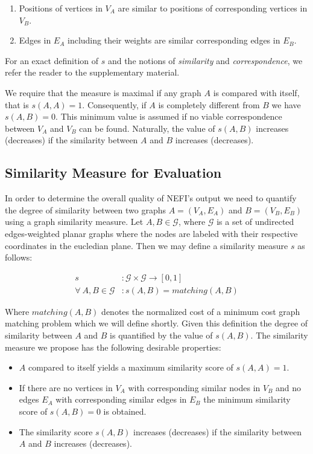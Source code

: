 		\begin{enumerate}
		\item Positions of vertices in $V_A$ are similar to positions of corresponding vertices in $V_B$.  
		\item Edges in $E_A$ including their weights are similar corresponding edges in $E_B$. 
		\end{enumerate}

		For an exact definition of $s$ and the notions of \emph{similarity} and \emph{correspondence}, we refer the reader to the supplementary material. 

		We require that the measure is maximal if any graph $A$ is compared with itself, that is $s(A,A) = 1$. Consequently, if $A$ is completely different from $B$ we have $s(A,B) = 0$. This minimum value is assumed if no viable correspondence between $V_A$ and $V_B$ can be found. Naturally, the value of $s(A,B)$ increases (decreases) if the similarity between $A$ and $B$ increases (decreases). 

	\subsection{Similarity Measure for Evaluation}

		In order to determine the overall quality of NEFI's output we need to quantify the degree of similarity between two graphs $A = (V_A, E_A)$ and $B = (V_B, E_B)$ using a graph similarity measure. Let $A, B \in \mathcal{G}$, where $\mathcal{G}$ is a set of undirected edges-weighted planar graphs where the nodes are labeled with their respective coordinates in the eucledian plane. Then we may define a similarity measure $s$ as follows:
		
		\begin{align}
		s &: \mathcal{G} \times \mathcal{G} \rightarrow [0,1] \\
		\forall \ A, B \in \mathcal{G} &: s(A,B) = matching(A,B)
		\end{align}

		Where $matching(A,B)$ denotes the normalized cost of a minimum cost graph matching problem which we will define shortly. Given this definition the degree of similarity between $A$ and $B$ is quantified by the value of $s(A,B)$. The similarity measure we propose has the following desirable properties:


		\begin{itemize}
			\item $A$ compared to itself yields a maximum similarity score of $s(A,A) = 1$.
			\item If there are no vertices in $V_A$ with corresponding similar nodes in $V_B$ and no edges $E_A$ with corresponding similar edges in $E_B$ the minimum similarity score of $s(A,B) = 0$ is obtained.
			\item The similarity score $s(A,B)$ increases (decreases) if the similarity between $A$ and $B$ increases (decreases).
		\end{itemize}

